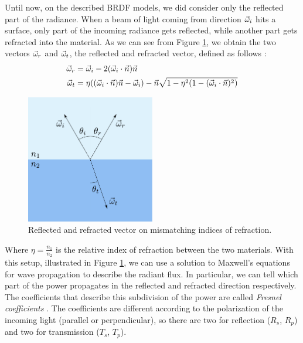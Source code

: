 Until now, on the described BRDF models, we did consider only the reflected part of the radiance. When a beam of light coming from direction $\vec{\omega}_i$ hits a surface, only part of the incoming radiance gets reflected, while another part gets refracted into the material. As we can see from Figure \ref{fig:fresnelsetup}, we obtain the two vectors $\vec{\omega}_r$ and $\vec{\omega}_t$, the reflected and refracted vector, defined as follows \citep{Kay:1979:TCS:965103.807438}:
\begin{equation*}
\begin{split}
\vec{\omega}_r &= \vec{\omega}_i - 2 (\vec{\omega}_i \cdot \vec{n}) \vec{n} \\
\vec{\omega}_t &= \eta ((\vec{\omega}_i \cdot \vec{n}) \vec{n} - \vec{\omega}_i) - \vec{n} \sqrt{1 - \eta^2 (1 - (\vec{\omega}_i \cdot \vec{n}) ^ 2)}
\end{split}
\end{equation*}
\begin{figure}[!ht]
\centering
\includegraphics[width=0.5\textwidth]{images/fresnelsetup.pdf}
\caption{Reflected and refracted vector on mismatching indices of refraction.}
\label{fig:fresnelsetup}
\end{figure}
Where $\eta = \frac{n_1}{n_2}$ is the relative index of refraction between the two materials. With this setup, illustrated in Figure \ref{fig:fresnelsetup}, we can use a solution to Maxwell's equations for wave propagation to describe the radiant flux. In particular, we can tell which part of the power propagates in the reflected and refracted direction respectively. The coefficients that describe this subdivision of the power are called \emph{Fresnel coefficients} \citep{ob:bornwolf}. The coefficients are different according to the polarization of the incoming light (parallel or perpendicular), so there are two for reflection ($R_s$, $R_p$) and two for transmission ($T_s$, $T_p$).
